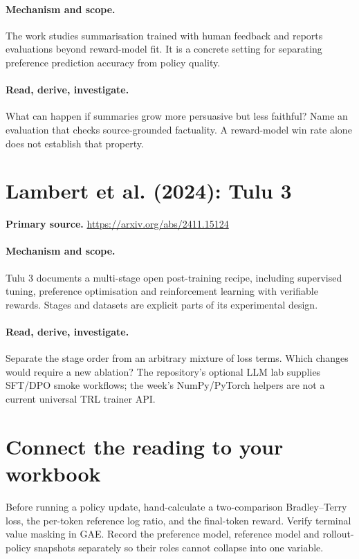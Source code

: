 \documentclass[11pt]{scrartcl}
\begin{document}
\paragraph{Mechanism and scope.} The work studies summarisation trained with human feedback and reports evaluations beyond reward-model fit. It is a concrete setting for separating preference prediction accuracy from policy quality.

\paragraph{Read, derive, investigate.} What can happen if summaries grow more persuasive but less faithful? Name an evaluation that checks source-grounded factuality. A reward-model win rate alone does not establish that property.

\section{Lambert et al. (2024): Tulu 3}
\noindent\textbf{Primary source.} \url{https://arxiv.org/abs/2411.15124}

\paragraph{Mechanism and scope.} Tulu 3 documents a multi-stage open post-training recipe, including supervised tuning, preference optimisation and reinforcement learning with verifiable rewards. Stages and datasets are explicit parts of its experimental design.

\paragraph{Read, derive, investigate.} Separate the stage order from an arbitrary mixture of loss terms. Which changes would require a new ablation? The repository's optional LLM lab supplies SFT/DPO smoke workflows; the week's NumPy/PyTorch helpers are not a current universal TRL trainer API.

\section*{Connect the reading to your workbook}
Before running a policy update, hand-calculate a two-comparison Bradley--Terry loss, the per-token reference log ratio, and the final-token reward. Verify terminal value masking in GAE. Record the preference model, reference model and rollout-policy snapshots separately so their roles cannot collapse into one variable.
\end{document}
